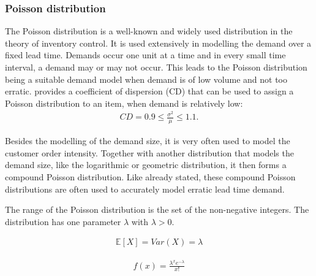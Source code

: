 \documentclass{article}
\begin{document}
\subsubsection{Poisson distribution}
\begin{flushleft}
    The Poisson distribution is a well-known and widely used distribution in the theory of inventory control.
    It is used extensively in modelling the demand over a fixed lead time.
    Demands occur one unit at a time and in every small time interval, a demand may or may not occur.
    This leads to the Poisson distribution being a suitable demand model when demand is of low volume and not too erratic.
    \cite{RePEc:spr:isorms:978-3-319-15729-0} provides a coefficient of dispersion (CD) that can be used to assign a Poisson distribution to an item, when demand is relatively low:
    \begin{align*}
        CD = 0.9 \le \frac{\sigma^2}{\mu} \le 1.1.
    \end{align*}
\end{flushleft}
\begin{flushleft}
    Besides the modelling of the demand size, it is very often used to model the customer order intensity.
    Together with another distribution that models the demand size, like the logarithmic or geometric distribution, it then forms a compound Poisson distribution.
    Like already stated, these compound Poisson distributions are often used to accurately model erratic lead time demand.
\end{flushleft}
The range of the Poisson distribution is the set of the non-negative integers. The distribution has one parameter $\lambda$ with $\lambda > 0$.

\begin{align*}
    \mathbb{E}[X] = Var(X) = \lambda
\end{align*}

\begin{align*}
    f(x) = \frac{\lambda^xe^{-\lambda}}{x!}
\end{align*}
\end{document}
